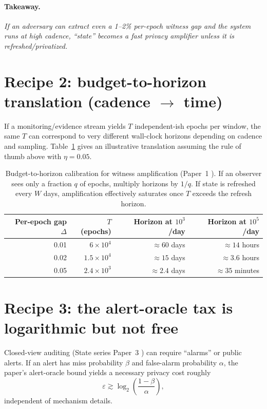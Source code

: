 \documentclass[11pt]{article}
\newcommand{\takeaway}[1]{\paragraph{Takeaway.}\emph{#1}}
\begin{document}
\takeaway{If an adversary can extract even a 1--2\% per-epoch witness gap and the system runs at high cadence, ``state'' becomes a fast privacy amplifier unless it is refreshed/privatized.}

\section{Recipe 2: budget-to-horizon translation (cadence \texorpdfstring{$\rightarrow$}{->} time)}
If a monitoring/evidence stream yields $T$ independent-ish epochs per window, the same $T$ can correspond to very different wall-clock horizons depending on cadence and sampling.
Table~\ref{tab:budget-horizon} gives an illustrative translation assuming the rule of thumb above with $\eta=0.05$.

\begin{table}[h]
\centering
\begin{tabular}{@{}rrrr@{}}
\toprule
Per-epoch gap $\Delta$ & $T$ (epochs) & Horizon at $10^3$/day & Horizon at $10^5$/day \\
\midrule
0.01 & $6\times 10^4$ & $\approx 60$ days & $\approx 14$ hours \\
0.02 & $1.5\times 10^4$ & $\approx 15$ days & $\approx 3.6$ hours \\
0.05 & $2.4\times 10^3$ & $\approx 2.4$ days & $\approx 35$ minutes \\
\bottomrule
\end{tabular}
\caption{Budget-to-horizon calibration for witness amplification (Paper~1 \cite{state1}). If an observer sees only a fraction $q$ of epochs, multiply horizons by $1/q$. If state is refreshed every $W$ days, amplification effectively saturates once $T$ exceeds the refresh horizon.}
\label{tab:budget-horizon}
\end{table}

\section{Recipe 3: the alert-oracle tax is logarithmic but not free}
Closed-view auditing (State series Paper~3 \cite{state3}) can require ``alarms'' or public alerts. If an alert has miss probability $\beta$ and false-alarm probability $\alpha$, the paper's alert-oracle bound yields a necessary privacy cost roughly
\[
\varepsilon \gtrsim \log_2\!\left(\frac{1-\beta}{\alpha}\right),
\]
independent of mechanism details.
\end{document}
